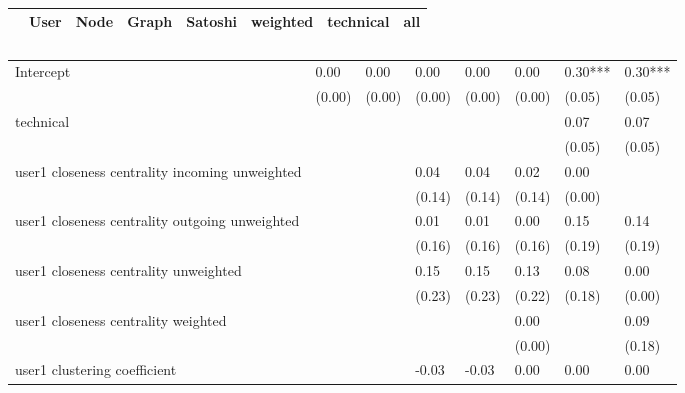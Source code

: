\begin{table}
\caption{}
\begin{center}
\begin{tabular}{lccccccc}
\hline
                                               &   User  &   Node  &  Graph  & Satoshi & weighted & technical &   all    \\
\hline
\hline
\end{tabular}
\begin{tabular}{llllllll}
Intercept                                      & 0.00    & 0.00    & 0.00    & 0.00    & 0.00     & 0.30***   & 0.30***  \\
                                               & (0.00)  & (0.00)  & (0.00)  & (0.00)  & (0.00)   & (0.05)    & (0.05)   \\
technical                                      &         &         &         &         &          & 0.07      & 0.07     \\
                                               &         &         &         &         &          & (0.05)    & (0.05)   \\
user1 closeness centrality incoming unweighted &         &         & 0.04    & 0.04    & 0.02     & 0.00      &          \\
                                               &         &         & (0.14)  & (0.14)  & (0.14)   & (0.00)    &          \\
user1 closeness centrality outgoing unweighted &         &         & 0.01    & 0.01    & 0.00     & 0.15      & 0.14     \\
                                               &         &         & (0.16)  & (0.16)  & (0.16)   & (0.19)    & (0.19)   \\
user1 closeness centrality unweighted          &         &         & 0.15    & 0.15    & 0.13     & 0.08      & 0.00     \\
                                               &         &         & (0.23)  & (0.23)  & (0.22)   & (0.18)    & (0.00)   \\
user1 closeness centrality weighted            &         &         &         &         & 0.00     &           & 0.09     \\
                                               &         &         &         &         & (0.00)   &           & (0.18)   \\
user1 clustering coefficient                   &         &         & -0.03   & -0.03   & 0.00     & 0.00      & 0.00     \\

\end{tabular}
\end{center}
\end{table}
